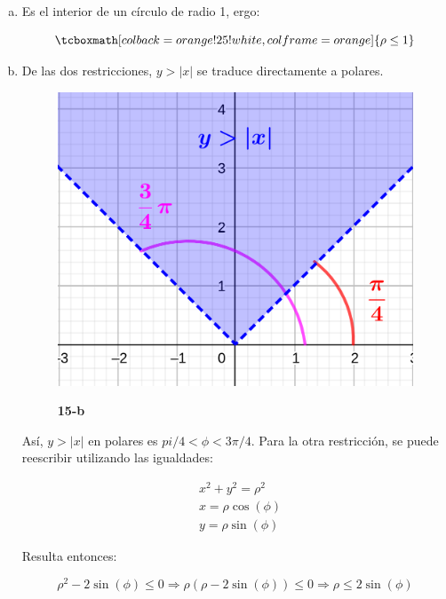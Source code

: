 \documentclass{article}
\begin{document}
\begin{enumerate}[(a)]
\item Es el interior de un círculo de radio 1, ergo:

\begin{equation}
\tcboxmath[colback=orange!25!white,colframe=orange]
{ \rho \leq 1 }
\end{equation}

\item De las dos restricciones, $y > |x|$ se traduce directamente a polares.

\begin{figure}[ht]
\caption{\textbf{15-b}}
\includegraphics[scale=1]{img/ejercicios/1/15-b.png} 
\centering
\label{fig:1-15-b}
\end{figure}

Así, $y > |x|$ en polares es $pi/4 < \phi < 3\pi/4$. Para la otra restricción, se puede reescribir utilizando las igualdades:

\begin{subequations}
\begin{align}
& x^2 + y^2 = \rho^2 \\
& x = \rho \cos(\phi) \\
& y = \rho \sin(\phi)
\end{align}
\end{subequations}

Resulta entonces:

\begin{equation}
\rho^2 - 2 \sin(\phi) \leq 0 \Rightarrow \rho (\rho - 2 \sin(\phi)) \leq 0 \Rightarrow \rho \leq 2 \sin(\phi)
\end{equation}


\end{enumerate}
\end{document}
